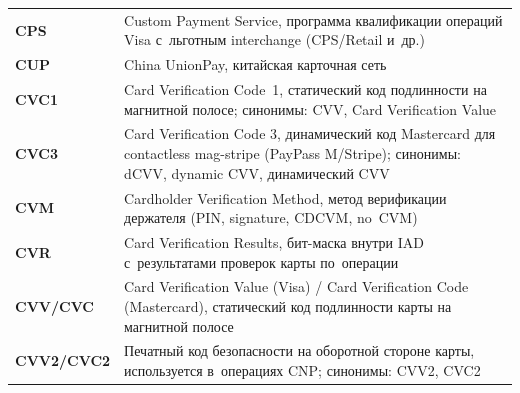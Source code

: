 \begin{longtable}{@{}p{4.5em}p{\dimexpr\linewidth-4.5em-2\tabcolsep\relax}@{}}
  \textbf{CPS}               & Custom Payment Service, программа квалификации операций Visa с~льготным interchange (CPS/Retail и~др.)                                                                                                                                                                                           \\
  \textbf{CUP}               & China UnionPay, китайская карточная сеть                                                                                                                                                                                                                                                        \\
  \textbf{CVC1}              & Card Verification Code~1, статический код подлинности на магнитной полосе; синонимы: CVV, Card Verification Value                                                                                                                                                                                \\
  \textbf{CVC3}              & Card Verification Code 3, динамический код Mastercard для contactless mag-stripe (PayPass M/Stripe); синонимы: dCVV, dynamic CVV, динамический CVV                                                                                                                                                \\
  \textbf{CVM}               & Cardholder Verification Method, метод верификации держателя (PIN, signature, CDCVM, no~CVM)                                                                                                                                                                                                      \\
  \textbf{CVR}               & Card Verification Results, бит-маска внутри IAD с~результатами проверок карты по~операции                                                                                                                                                                                                       \\
  \textbf{CVV/CVC}           & Card Verification Value (Visa) / Card Verification Code (Mastercard), статический код подлинности карты на магнитной полосе                                                                                                                                                                      \\
  \textbf{CVV2/\-CVC2}         & Печатный код безопасности на оборотной стороне карты, используется в~операциях CNP; синонимы: CVV2, CVC2                                                                                                                                                                                         \\

\end{longtable}
